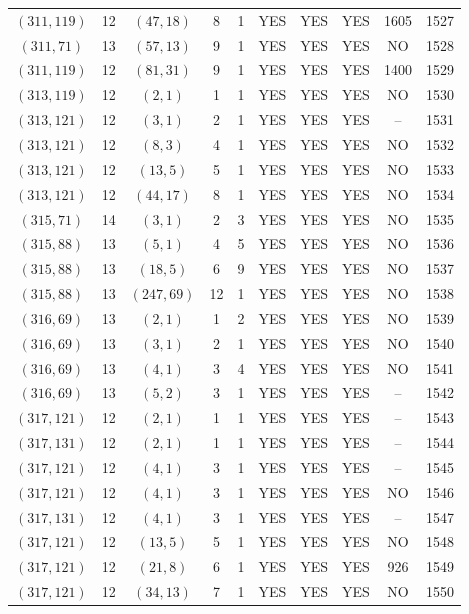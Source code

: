 \begin{longtable}{|c|c|c|c|c|c|c|c|c|c|}
$(311, 119)$ & 12 & $(47, 18)$ & 8 & 1 & YES & YES & YES & 1605 & 1527\\
$(311, 71)$ & 13 & $(57, 13)$ & 9 & 1 & YES & YES & YES & NO & 1528\\
$(311, 119)$ & 12 & $(81, 31)$ & 9 & 1 & YES & YES & YES & 1400 & 1529\\
$(313, 119)$ & 12 & $(2, 1)$ & 1 & 1 & YES & YES & YES & NO & 1530\\
$(313, 121)$ & 12 & $(3, 1)$ & 2 & 1 & YES & YES & YES & -- & 1531\\
$(313, 121)$ & 12 & $(8, 3)$ & 4 & 1 & YES & YES & YES & NO & 1532\\
$(313, 121)$ & 12 & $(13, 5)$ & 5 & 1 & YES & YES & YES & NO & 1533\\
$(313, 121)$ & 12 & $(44, 17)$ & 8 & 1 & YES & YES & YES & NO & 1534\\
$(315, 71)$ & 14 & $(3, 1)$ & 2 & 3 & YES & YES & YES & NO & 1535\\
$(315, 88)$ & 13 & $(5, 1)$ & 4 & 5 & YES & YES & YES & NO & 1536\\
$(315, 88)$ & 13 & $(18, 5)$ & 6 & 9 & YES & YES & YES & NO & 1537\\
$(315, 88)$ & 13 & $(247, 69)$ & 12 & 1 & YES & YES & YES & NO & 1538\\
$(316, 69)$ & 13 & $(2, 1)$ & 1 & 2 & YES & YES & YES & NO & 1539\\
$(316, 69)$ & 13 & $(3, 1)$ & 2 & 1 & YES & YES & YES & NO & 1540\\
$(316, 69)$ & 13 & $(4, 1)$ & 3 & 4 & YES & YES & YES & NO & 1541\\
$(316, 69)$ & 13 & $(5, 2)$ & 3 & 1 & YES & YES & YES & -- & 1542\\
$(317, 121)$ & 12 & $(2, 1)$ & 1 & 1 & YES & YES & YES & -- & 1543\\
$(317, 131)$ & 12 & $(2, 1)$ & 1 & 1 & YES & YES & YES & -- & 1544\\
$(317, 121)$ & 12 & $(4, 1)$ & 3 & 1 & YES & YES & YES & -- & 1545\\
$(317, 121)$ & 12 & $(4, 1)$ & 3 & 1 & YES & YES & YES & NO & 1546\\
$(317, 131)$ & 12 & $(4, 1)$ & 3 & 1 & YES & YES & YES & -- & 1547\\
$(317, 121)$ & 12 & $(13, 5)$ & 5 & 1 & YES & YES & YES & NO & 1548\\
$(317, 121)$ & 12 & $(21, 8)$ & 6 & 1 & YES & YES & YES & 926 & 1549\\
$(317, 121)$ & 12 & $(34, 13)$ & 7 & 1 & YES & YES & YES & NO & 1550\\

\end{longtable}
